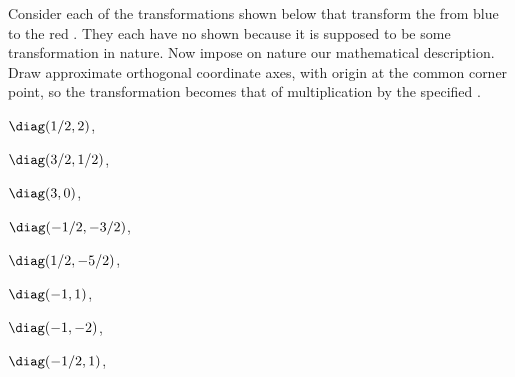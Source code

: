 \begin{exercise} \label{ex:} 
Consider each of the transformations shown below that transform the from blue  to the red .
They each have no  shown because it is supposed to be some transformation in nature. 
Now impose on nature our mathematical description.
Draw approximate orthogonal coordinate axes, with origin at the common corner point, so the transformation becomes that of multiplication by the specified .
\begin{parts}
\item \(\diag(1/2,2)\),

\item \(\diag(3/2,1/2)\),

\item \(\diag(3,0)\),

\item \(\diag(-1/2,-3/2)\),

\item \(\diag(1/2,-5/2)\),

\item \(\diag(-1,1)\),

\item \(\diag(-1,-2)\),

\item \(\diag(-1/2,1)\),

\end{parts}
\end{exercise}



